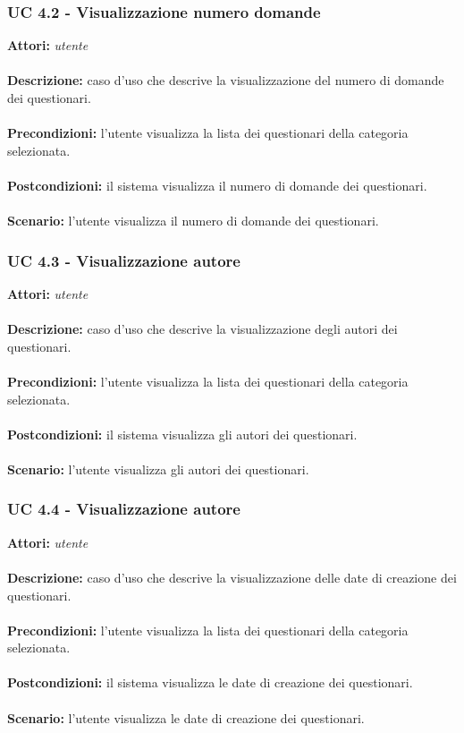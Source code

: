 \documentclass[a4paper,11pt]{article}
\begin{document}
\subsubsection{UC 4.2 - Visualizzazione numero domande}

\textbf{Attori:} \textit{utente}
\\ \\
\textbf{Descrizione:} caso d'uso che descrive la visualizzazione del numero di domande dei questionari.\\
\\
\textbf{Precondizioni:} l'utente visualizza la lista dei questionari della categoria selezionata.\\
\\
\textbf{Postcondizioni:} il sistema visualizza il numero di domande dei questionari.\\
\\
\textbf{Scenario:} l’utente visualizza il numero di domande dei questionari.\\


\subsubsection{UC 4.3 - Visualizzazione autore}

\textbf{Attori:} \textit{utente}
\\ \\
\textbf{Descrizione:} caso d'uso che descrive la visualizzazione degli autori dei questionari.\\
\\
\textbf{Precondizioni:} l'utente visualizza la lista dei questionari della categoria selezionata.\\
\\
\textbf{Postcondizioni:} il sistema visualizza gli autori dei questionari.\\
\\
\textbf{Scenario:} l’utente visualizza gli autori dei questionari.\\


\subsubsection{UC 4.4 - Visualizzazione autore}

\textbf{Attori:} \textit{utente}
\\ \\
\textbf{Descrizione:} caso d'uso che descrive la visualizzazione delle date di creazione dei questionari.\\
\\
\textbf{Precondizioni:} l'utente visualizza la lista dei questionari della categoria selezionata.\\
\\
\textbf{Postcondizioni:} il sistema visualizza le date di creazione dei questionari.\\
\\
\textbf{Scenario:} l’utente visualizza le date di creazione dei questionari.\\
\end{document}
